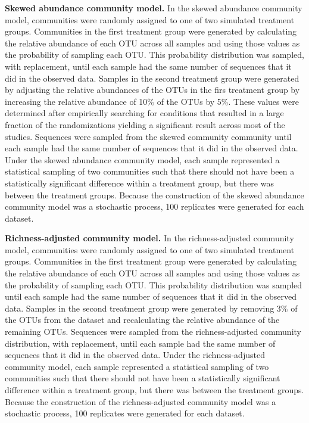\documentclass[
]{article}
\begin{document}
\textbf{Skewed abundance community model.} In the skewed abundance
community model, communities were randomly assigned to one of two
simulated treatment groups. Communities in the first treatment group
were generated by calculating the relative abundance of each OTU across
all samples and using those values as the probability of sampling each
OTU. This probability distribution was sampled, with replacement, until
each sample had the same number of sequences that it did in the observed
data. Samples in the second treatment group were generated by adjusting
the relative abundances of the OTUs in the firs treatment group by
increasing the relative abundance of 10\% of the OTUs by 5\%. These
values were determined after empirically searching for conditions that
resulted in a large fraction of the randomizations yielding a
significant result across most of the studies. Sequences were sampled
from the skewed community community until each sample had the same
number of sequences that it did in the observed data. Under the skewed
abundance community model, each sample represented a statistical
sampling of two communities such that there should not have been a
statistically significant difference within a treatment group, but there
was between the treatment groups. Because the construction of the skewed
abundance community model was a stochastic process, 100 replicates were
generated for each dataset.

\textbf{Richness-adjusted community model.} In the richness-adjusted
community model, communities were randomly assigned to one of two
simulated treatment groups. Communities in the first treatment group
were generated by calculating the relative abundance of each OTU across
all samples and using those values as the probability of sampling each
OTU. This probability distribution was sampled until each sample had the
same number of sequences that it did in the observed data. Samples in
the second treatment group were generated by removing 3\% of the OTUs
from the dataset and recalculating the relative abundance of the
remaining OTUs. Sequences were sampled from the richness-adjusted
community distribution, with replacement, until each sample had the same
number of sequences that it did in the observed data. Under the
richness-adjusted community model, each sample represented a statistical
sampling of two communities such that there should not have been a
statistically significant difference within a treatment group, but there
was between the treatment groups. Because the construction of the
richness-adjusted community model was a stochastic process, 100
replicates were generated for each dataset.
\end{document}
